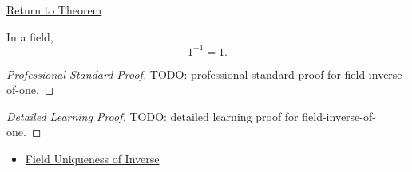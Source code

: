 \newpage
{}
\label{prf:field-inverse-of-one}

\begin{remark*}[Return]
\hyperref[thm:field-inverse-of-one]{Return to Theorem}
\end{remark*}

\begin{theorem*}
In a field,
\[
1^{-1}=1.
\]
\end{theorem*}

\begin{proof}[Professional Standard Proof]
\LRAProofBodyStart
TODO: professional standard proof for field-inverse-of-one.
\end{proof}

\begin{proof}[Detailed Learning Proof]
\LRAProofBodyStart
TODO: detailed learning proof for field-inverse-of-one.
\end{proof}

\begin{remark*}
\end{remark*}

\begin{dependencies}
\begin{itemize}
  \item \hyperref[thm:field-uniqueness-of-inverse]{Field Uniqueness of Inverse}
\end{itemize}
\end{dependencies}

\clearpage
